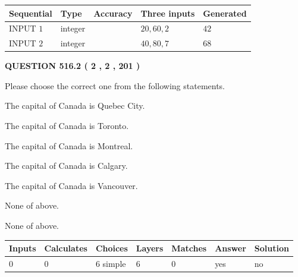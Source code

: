 \documentclass[12pt]{article}
\begin{document}
  
\noindent\begin{tabular}{|l|l|l|l|l|}
\hline
 Sequential & Type & Accuracy & Three inputs & Generated \\ 
\hline
 
 
  INPUT $  1 $ & integer &  & $
 20
 , 
 60
 , 
 2
 $ & $ 42 $ 
 \\  \hline  
 
 
  INPUT $  2 $ & integer &  & $
 40
 , 
 80
 , 
 7
 $ & $ 68 $ 
 \\  \hline  
 \end{tabular}
   
   
  
\vspace{0.2in}
  
{\textbf{\Large{QUESTION
516.2 
 ( 2 , 2 , 201 )
}}}
  
  
Please choose the correct one from the following statements.
 
 
The capital of Canada is Quebec City.
 
 
The capital of Canada is Toronto.
 
 
The capital of Canada is Montreal.
 
 
The capital of Canada is Calgary.
 
 
The capital of Canada is Vancouver.
 
 
 None of above.
 
 
\noindent{}
 
 
 None of above.
 
 
\noindent{}
 
 
   
   
   
   
\noindent\begin{tabular}{|l|l|l|l|l|l|l|}
 \hline
Inputs & Calculates & Choices & Layers & Matches & Answer & Solution \\ \hline
 0  & 
 0  & 
 6
  simple  
  & 
 6  & 
 0  & 
  yes & 
  no 
  \\ \hline
 \end{tabular}
   
   
   
\end{document}
